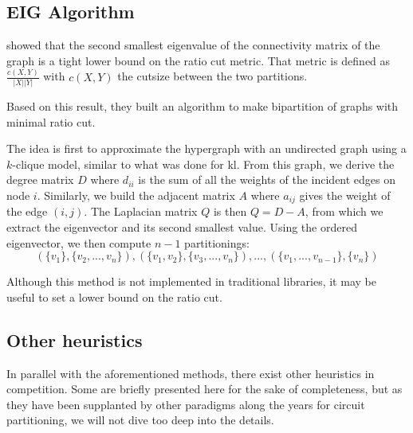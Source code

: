 \documentclass[11pt,a4paper]{report} %
\theoremstyle{customdef}
\begin{document}
\subsection{EIG Algorithm}
\citet{Hagen1992} showed that the second smallest eigenvalue of the connectivity matrix of the graph is a tight lower bound on the ratio cut metric.
That metric is defined as $\frac{c(X,Y)}{|X||Y|}$ with $c(X, Y)$ the cutsize between the two partitions.

Based on this result, they built an algorithm to make bipartition of graphs with minimal ratio cut.

The idea is first to approximate the hypergraph with an undirected graph using a $k$-clique model, similar to what was done for \gls{kl}.
From this graph, we derive the degree matrix $D$ where  $d_{ii}$ is the sum of all the weights of the incident edges on node $i$.
Similarly, we build the adjacent matrix $A$ where $a_{ij}$ gives the weight of the edge $(i, j)$.
The Laplacian matrix $Q$ is then $Q = D - A$, from which we extract the eigenvector and its second smallest value.
Using the ordered eigenvector, we then compute $n-1$ partitionings: \[(\{v_1\}, \{v_2, ..., v_n\}), (\{v_1, v_2\}, \{v_3, ..., v_n\}), ..., (\{v_1, ..., v_{n-1}\}, \{v_n\})\]

Although this method is not implemented in traditional libraries, it may be useful to set a lower bound on the ratio cut.










\subsection{Other heuristics}
In parallel with the aforementioned methods, there exist other heuristics in competition.
Some are briefly presented here for the sake of completeness, but as they have been supplanted by other paradigms along the years for circuit partitioning, we will not dive too deep into the details.
\end{document}
